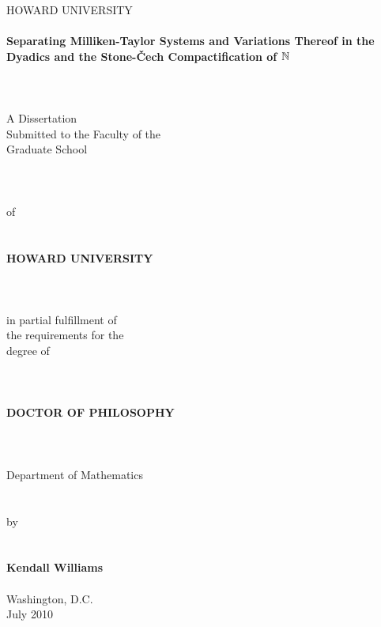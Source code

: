 \documentclass[12pt]{report}
\theoremstyle{definition}
\renewcommand{\baselinestretch}{1.5}\small\normalsize
\begin{document}
\renewcommand{\baselinestretch}{1}\small\normalsize\bigskip


\begin{titlepage}
\begin{center}
HOWARD UNIVERSITY\\\ \\
{\bf Separating Milliken-Taylor Systems and Variations 
Thereof in the Dyadics and the Stone-\v Cech Compactification 
of ${\bf\mathbb{N}}$}\\\
\\\ \\\ \\A Dissertation\\ Submitted to the Faculty of the\\
Graduate School\\\ \\\ \\\ \\ of \\\ \\\ \\{\bf HOWARD UNIVERSITY}\\\
\\\ \\\  \\in partial fulfillment of\\ the requirements for the \\degree of\\\ \\\ \\\ \\{\bf DOCTOR OF
PHILOSOPHY}\\\ \\\ \\\ \\Department of Mathematics\\\ \\\ \\by\\\ \\\ \\{\bf Kendall Williams}\\\ \\Washington, D.C.\\July 2010
\end{center}
\end{titlepage}





\setcounter{page}{2}
\end{document}
